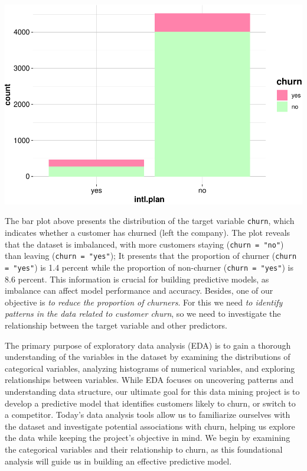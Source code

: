 \documentclass[
]{book}
\newcommand{\passthrough}[1]{#1}
\theoremstyle{definition}
\theoremstyle{definition}
\theoremstyle{definition}
\theoremstyle{definition}
\theoremstyle{remark}
\begin{document}
\begin{center}\includegraphics{EDA_files/figure-latex/unnamed-chunk-5-1} \end{center}

The bar plot above presents the distribution of the target variable \passthrough{\lstinline!churn!}, which indicates whether a customer has churned (left the company). The plot reveals that the dataset is imbalanced, with more customers staying (\passthrough{\lstinline!churn = "no"!}) than leaving (\passthrough{\lstinline!churn = "yes"!}); It presents that the proportion of churner (\passthrough{\lstinline!churn = "yes"!}) is 1.4 percent while the proportion of non-churner (\passthrough{\lstinline!churn = "yes"!}) is 8.6 percent. This information is crucial for building predictive models, as imbalance can affect model performance and accuracy. Besides, one of our objective is \emph{to reduce the proportion of churners}. For this we need \emph{to identify patterns in the data related to customer churn}, so we need to investigate the relationship between the target variable and other predictors.

The primary purpose of exploratory data analysis (EDA) is to gain a thorough understanding of the variables in the dataset by examining the distributions of categorical variables, analyzing histograms of numerical variables, and exploring relationships between variables. While EDA focuses on uncovering patterns and understanding data structure, our ultimate goal for this data mining project is to develop a predictive model that identifies customers likely to churn, or switch to a competitor. Today's data analysis tools allow us to familiarize ourselves with the dataset and investigate potential associations with churn, helping us explore the data while keeping the project's objective in mind. We begin by examining the categorical variables and their relationship to churn, as this foundational analysis will guide us in building an effective predictive model.
\end{document}
